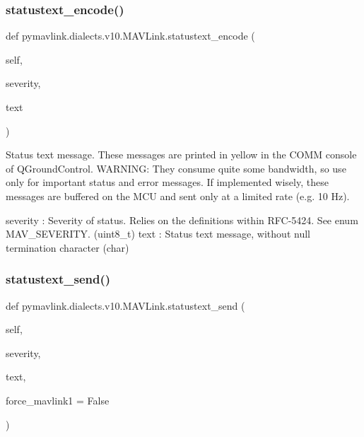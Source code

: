 \begin{DoxyVerb}
\begin{DoxyVerb}
\begin{DoxyVerb}
\begin{DoxyVerb}
\begin{DoxyVerb}
\begin{DoxyVerb}
\begin{DoxyVerb}
\begin{DoxyVerb}
\begin{DoxyVerb}
\begin{DoxyVerb}
\subsubsection{\texorpdfstring{statustext\+\_\+encode()}{statustext\_encode()}}
{\footnotesize\ttfamily def pymavlink.\+dialects.\+v10.\+M\+A\+V\+Link.\+statustext\+\_\+encode (\begin{DoxyParamCaption}\item[{}]{self,  }\item[{}]{severity,  }\item[{}]{text }\end{DoxyParamCaption})}

\begin{DoxyVerb}Status text message. These messages are printed in yellow in the COMM
console of QGroundControl. WARNING: They consume quite
some bandwidth, so use only for important status and
error messages. If implemented wisely, these messages
are buffered on the MCU and sent only at a limited
rate (e.g. 10 Hz).

severity                  : Severity of status. Relies on the definitions within RFC-5424. See enum MAV_SEVERITY. (uint8_t)
text                      : Status text message, without null termination character (char)\end{DoxyVerb}
 \mbox{\label{classpymavlink_1_1dialects_1_1v10_1_1MAVLink_abf7cae7535132ba8417fcfbbea639461}} 
\subsubsection{\texorpdfstring{statustext\+\_\+send()}{statustext\_send()}}
{\footnotesize\ttfamily def pymavlink.\+dialects.\+v10.\+M\+A\+V\+Link.\+statustext\+\_\+send (\begin{DoxyParamCaption}\item[{}]{self,  }\item[{}]{severity,  }\item[{}]{text,  }\item[{}]{force\+\_\+mavlink1 = {\ttfamily False} }\end{DoxyParamCaption})}


\end{DoxyVerb}
\end{DoxyVerb}
\end{DoxyVerb}
\end{DoxyVerb}
\end{DoxyVerb}
\end{DoxyVerb}
\end{DoxyVerb}
\end{DoxyVerb}
\end{DoxyVerb}
\end{DoxyVerb}
